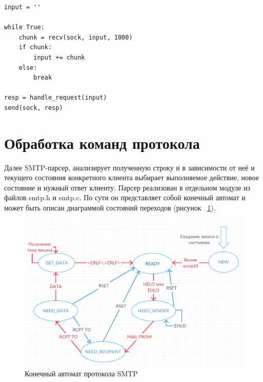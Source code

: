 \documentclass[a4paper,12pt]{report}
\begin{document}
\begin{verbatim}
input = ''

while True:
    chunk = recv(sock, input, 1000)
    if chunk:
        input += chunk
    else:
        break

resp = handle_request(input)
send(sock, resp)

\end{verbatim}



\section{Обработка команд протокола}

Далее SMTP-парсер, анализирует полученную строку и в зависимости от неё и текущего состояния конкретного клиента выбирает выполняемое действие, новое состояние и нужный ответ клиенту. Парсер реализован в отдельном модуле из файлов smtp.h и smtp.c. По сути он представляет собой конечный автомат и может быть описан диаграммой состояний переходов (рисунок ~\ref{fig:smtp_fsm}).

\begin{figure}
\centering
\includegraphics[width=\textwidth]{diagramms/smtp_fsm.png}
\caption{Конечный автомат протокола SMTP}
\label{fig:smtp_fsm}
\end{figure}
\end{document}

